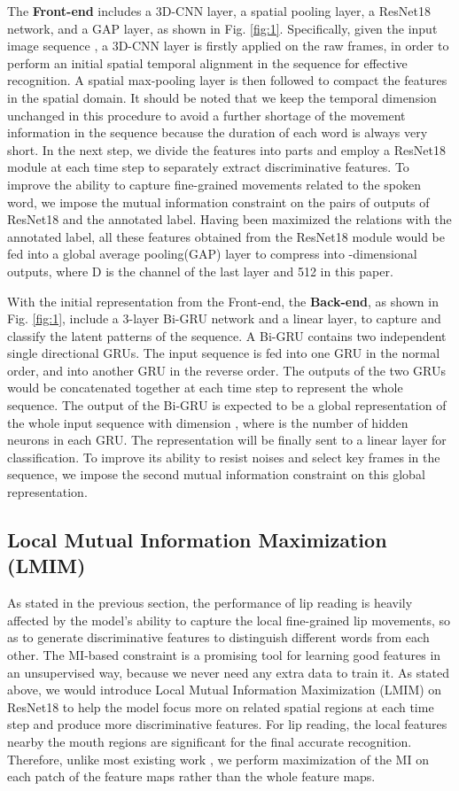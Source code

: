 \documentclass[a4paper, 10pt, conference]{ieeeconf}      \usepackage{FG2020}
\begin{document}
The \textbf{Front-end} includes a 3D-CNN layer, a spatial pooling layer, a ResNet18 network, and a GAP layer, as shown in Fig. \ref{fig:1}. Specifically, given the input image sequence , a 3D-CNN layer is firstly applied on the raw frames, in order to perform an initial spatial temporal alignment in the sequence for effective recognition. A spatial max-pooling layer is then followed to compact the features in the spatial domain. It should be noted that we keep the temporal dimension unchanged in this procedure to avoid a further shortage of the movement information in the sequence because the duration of each word is always very short. In the next step, we divide the features into  parts and employ a ResNet18 module at each time step  to separately extract discriminative features. To improve the ability to capture fine-grained movements related to the spoken word, we impose the mutual information constraint on the pairs of outputs of ResNet18 and the annotated label. Having been maximized the relations with the annotated label, all these features obtained from the ResNet18 module would be fed into a global average pooling(GAP) layer to compress into -dimensional outputs, where D is the channel of the last layer and 512 in this paper.

With the initial representation from the Front-end, the \textbf{Back-end}, as shown in Fig. \ref{fig:1}, include a 3-layer Bi-GRU network and a linear layer, to capture and classify the latent patterns of the sequence. A Bi-GRU contains two independent single directional GRUs. The input sequence is fed into one GRU in the normal order, and into another GRU in the reverse order. The outputs of the two GRUs would be concatenated together at each time step to represent the whole sequence. The output of the Bi-GRU is expected to be a global representation of the whole input sequence with dimension , where  is the number of hidden neurons in each GRU. The representation will be finally sent to a linear layer for classification. To improve its ability to resist noises and select key frames in the sequence, we impose the second mutual information constraint on this global representation. 

\subsection{Local Mutual Information Maximization (LMIM)}
As stated in the previous section, the performance of lip reading is heavily affected by the model’s ability to capture the local fine-grained lip movements, so as to generate discriminative features to distinguish different words from each other. The MI-based constraint is a promising tool for learning good features in an unsupervised way, because we never need any extra data to train it. As stated above, we would introduce Local Mutual Information Maximization (LMIM) on ResNet18 to help the model focus more on related spatial regions at each time step and produce more discriminative features. For lip reading, the local features nearby the mouth regions are significant for the final accurate recognition. Therefore, unlike most existing work \cite{krishna2019information,zhu2018high}, we perform maximization of the MI on each patch of the feature maps rather than the whole feature maps.
\end{document}
